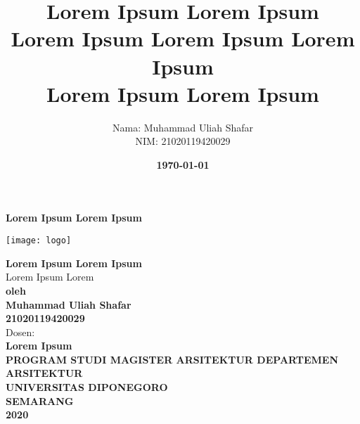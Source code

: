 \documentclass[11pt]{simart} %
\title{
\textbf{Lorem Ipsum Lorem Ipsum \\
Lorem Ipsum Lorem Ipsum Lorem Ipsum} \\
\textbf{{Lorem Ipsum Lorem Ipsum \\}}
} %
\date{\textbf{\today}}
\author{
\begin{tabular}{@{}ll@{}}
	Nama & : Muhammad Uliah Shafar\\
	NIM & : 21020119420029\\
\end{tabular}
}
\begin{document}
\thispagestyle{empty}
\begin{center}
	\begin{huge}
		\bf{Lorem Ipsum Lorem Ipsum}
	\end{huge}

	\vspace{20pt}
	\texttt{[image: logo]} \\

	\vspace*{35pt}

	\begin{large}
		\textbf{Lorem Ipsum Lorem Ipsum} \\
		Lorem Ipsum Lorem\\

		\vspace{20pt}
		\textbf{oleh\\
			\vspace{20pt}
			Muhammad Uliah Shafar\\21020119420029}\\

		\vspace{20pt}
		Dosen: \\
		\textbf{Lorem Ipsum}\\



		\vspace{60pt}
		\textbf{PROGRAM STUDI MAGISTER ARSITEKTUR DEPARTEMEN ARSITEKTUR\\
			UNIVERSITAS DIPONEGORO\\
			SEMARANG\\
			2020
		}
	\end{large}
\end{center}
\clearpage

\maketitle %

\end{document}
